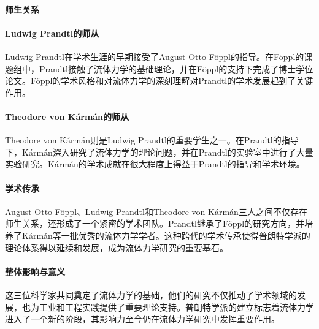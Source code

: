 \begin{add}
    \paragraph{师生关系}
    
    \paragraph{Ludwig Prandtl的师从}
    
    Ludwig Prandtl在学术生涯的早期接受了August Otto Föppl的指导。在Föppl的课题组中，Prandtl接触了流体力学的基础理论，并在Föppl的支持下完成了博士学位论文。Föppl的学术风格和对流体力学的深刻理解对Prandtl的学术发展起到了关键作用。
    
    \paragraph{Theodore von Kármán的师从}
    
    Theodore von Kármán则是Ludwig Prandtl的重要学生之一。在Prandtl的指导下，Kármán深入研究了流体力学的理论问题，并在Prandtl的实验室中进行了大量实验研究。Kármán的学术成就在很大程度上得益于Prandtl的指导和学术环境。
    
    \paragraph{学术传承}
    
    August Otto Föppl、Ludwig Prandtl和Theodore von Kármán三人之间不仅存在师生关系，还形成了一个紧密的学术团队。Prandtl继承了Föppl的研究方向，并培养了Kármán等一批优秀的流体力学学者。这种跨代的学术传承使得普朗特学派的理论体系得以延续和发展，成为流体力学研究的重要基石。
    
    \paragraph{整体影响与意义}
    
    这三位科学家共同奠定了流体力学的基础，他们的研究不仅推动了学术领域的发展，也为工业和工程实践提供了重要理论支持。普朗特学派的建立标志着流体力学进入了一个新的阶段，其影响力至今仍在流体力学研究中发挥重要作用。
    \end{add}
